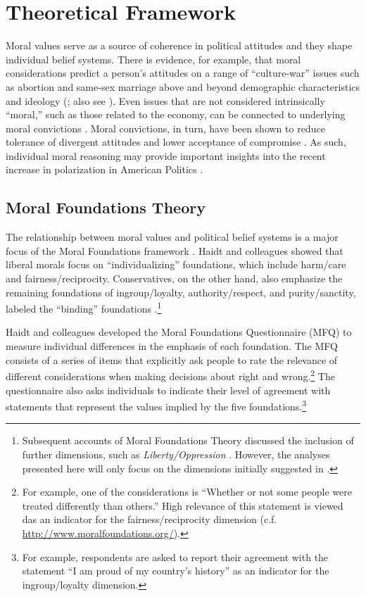 \documentclass[12pt]{article}
\begin{document}
\section{Theoretical Framework}

Moral values serve as a source of coherence in political attitudes and they shape individual belief systems. There is evidence, for example, that moral considerations predict a person's attitudes on a range of ``culture-war'' issues such as abortion and same-sex marriage above and beyond demographic characteristics and ideology (\citealt{koleva2012tracing}; also see \citealt{clifford2015concerns}). Even issues that are not considered intrinsically ``moral,'' such as those related to the economy, can be connected to underlying moral convictions \citep{ryan2014reconsidering}. Moral convictions, in turn, have been shown to reduce tolerance of divergent attitudes and lower acceptance of compromise \citep[][]{skitka2010psychology,ryan2016no}. As such, individual moral reasoning may provide important insights into the recent increase in polarization in American Politics \citep{iyengar2015fear}.


\subsection{Moral Foundations Theory}

The relationship between moral values and political belief systems is a major focus of the Moral Foundations framework \citep[c.f.][]{haidt2012righteous}. Haidt and colleagues showed that liberal morals focus on ``individualizing'' foundations, which include harm/care and fairness/reciprocity. Conservatives, on the other hand, also emphasize the remaining foundations of ingroup/loyalty, authority/respect, and purity/sanctity, labeled the ``binding'' foundations \citep{haidt2007morality,graham2009liberals}.\footnote{Subsequent accounts of Moral Foundations Theory discussed the inclusion of further dimensions, such as \textit{Liberty/Oppression} \citep[c.f.][]{graham2013moral,haidt2012righteous}. However, the analyses presented here will only focus on the dimensions initially suggested in \citet{haidt2008moral}.}

Haidt and colleagues developed the Moral Foundations Questionnaire (MFQ) to measure individual differences in the emphasis of each foundation. The MFQ consists of a series of items that explicitly ask people to rate the relevance of different considerations when making decisions about right and wrong.\footnote{For example, one of the considerations is ``Whether or not some people were treated differently than others.'' High relevance of this statement is viewed das an indicator for the fairness/reciprocity dimension (c.f. \url{http://www.moralfoundations.org/}).} The questionnaire also asks individuals to indicate their level of agreement with statements that represent the values implied by the five foundations.\footnote{For example, respondents are asked to report their agreement with the statement ``I am proud of my country’s history'' as an indicator for the ingroup/loyalty dimension.}
\end{document}

